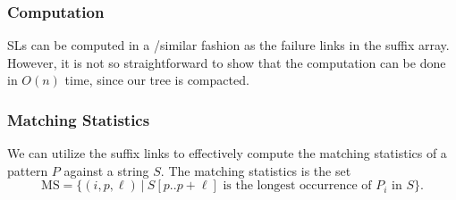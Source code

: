 \subsubsection{Computation}
SLs can be computed in a /similar fashion as the failure links in the suffix array. However, it is not so straightforward to show that the computation can be done in $O(n)$ time, since our tree is compacted.

\subsubsection{Matching Statistics}
We can utilize the suffix links to effectively compute the matching statistics of a pattern $P$ against a string $S$.
The matching statistics is the set $$\text{MS} = \{(i, p,\ell) ~|~ S[p..p+\ell] \text{ is the longest occurrence of } P_i \text{ in } S \}.$$